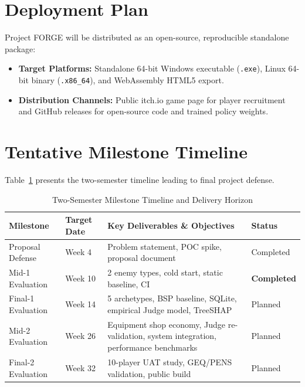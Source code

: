 \section{Deployment Plan}
Project FORGE will be distributed as an open-source, reproducible standalone package:
\begin{itemize}
    \item \textbf{Target Platforms:} Standalone 64-bit Windows executable (\texttt{.exe}), Linux 64-bit binary (\texttt{.x86\_64}), and WebAssembly HTML5 export.
    \item \textbf{Distribution Channels:} Public itch.io game page for player recruitment and GitHub releases for open-source code and trained policy weights.
\end{itemize}

\section{Tentative Milestone Timeline}
Table~\ref{tab:gantt_plan} presents the two-semester timeline leading to final project defense.

\begin{table}[!htbp]
\centering
\caption{Two-Semester Milestone Timeline and Delivery Horizon}
\label{tab:gantt_plan}
\small
\begin{tabular}{p{}p{}p{}p{}}
\toprule
\textbf{Milestone} & \textbf{Target Date} & \textbf{Key Deliverables \& Objectives} & \textbf{Status} \\
\midrule
Proposal Defense & Week 4 & Problem statement, POC spike, proposal document & Completed \\
Mid-1 Evaluation & Week 10 & 2 enemy types, cold start, static baseline, CI & \textbf{Completed} \\
Final-1 Evaluation & Week 14 & 5 archetypes, BSP baseline, SQLite, empirical Judge model, TreeSHAP & Planned \\
Mid-2 Evaluation & Week 26 & Equipment shop economy, Judge re-validation, system integration, performance benchmarks & Planned \\
Final-2 Evaluation & Week 32 & 10-player UAT study, GEQ/PENS validation, public build & Planned \\
\bottomrule
\end{tabular}
\end{table}

